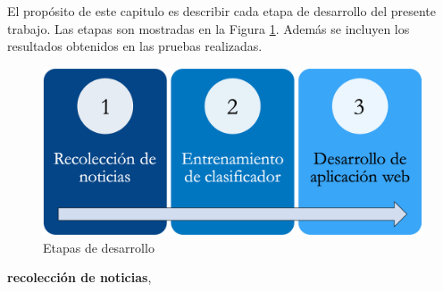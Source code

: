 \ \\\\

El propósito de este capitulo es describir cada etapa de desarrollo del presente trabajo. Las etapas son mostradas en la Figura \ref{fig:cp5:etapas}. Además se incluyen los resultados obtenidos en las pruebas realizadas. 

\begin{figure}[h]
\centering
\includegraphics[scale=.35]{imagenes/Capitulo5/Etapas.png}
\caption{Etapas de desarrollo}
\label{fig:cp5:etapas}
\end{figure}

\textbf{recolección de noticias},  


\newpage

\newpage



